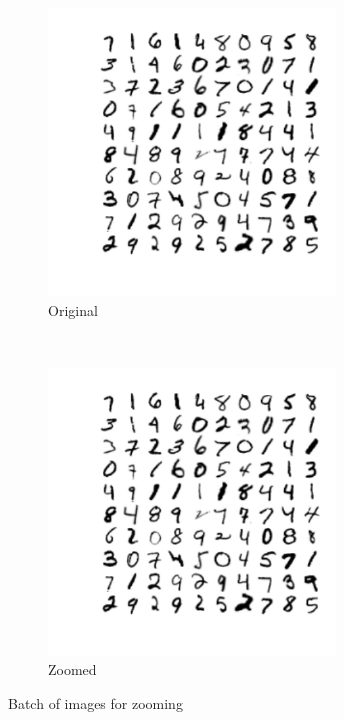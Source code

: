 \documentclass[11pt]{article}
\begin{document}
\begin{figure}[htp]
    \centering
    \begin{subfigure}[t]{0.45\textwidth}
        \centering
        \includegraphics[height=3in]{zoom_org}
        \caption{Original}
    \end{subfigure}%
    ~ 
    \begin{subfigure}[t]{0.45\textwidth}
        \centering
        \includegraphics[height=3in]{zoom_img}
        \caption{Zoomed}
    \end{subfigure}
    \caption{Batch of images for zooming}
    \label{fg:zoom_batch}
\end{figure}
\end{document}
